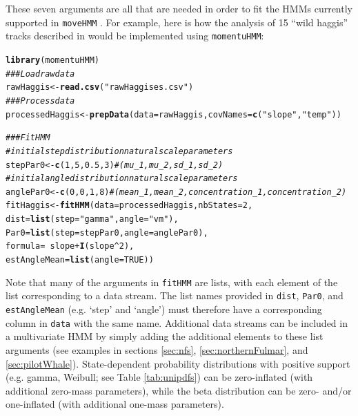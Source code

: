 \documentclass[12pt]{article}\usepackage[]{graphicx}\usepackage[]{xcolor}
\makeatletter
\newcommand{\hlnum}[1]{\textcolor[rgb]{0.686,0.059,0.569}{#1}}%
\newcommand{\hlsng}[1]{\textcolor[rgb]{0.192,0.494,0.8}{#1}}%
\newcommand{\hlcom}[1]{\textcolor[rgb]{0.678,0.584,0.686}{\textit{#1}}}%
\newcommand{\hlopt}[1]{\textcolor[rgb]{0,0,0}{#1}}%
\newcommand{\hldef}[1]{\textcolor[rgb]{0.345,0.345,0.345}{#1}}%
\newcommand{\hlkwb}[1]{\textcolor[rgb]{0.69,0.353,0.396}{#1}}%
\newcommand{\hlkwc}[1]{\textcolor[rgb]{0.333,0.667,0.333}{#1}}%
\newcommand{\hlkwd}[1]{\textcolor[rgb]{0.737,0.353,0.396}{\textbf{#1}}}%
\newenvironment{kframe}{%
 \def\at@end@of@kframe{}%
 \ifinner\ifhmode%
  \def\at@end@of@kframe{\end{minipage}}%
  \begin{minipage}{\columnwidth}%
 \fi\fi%
 \def\FrameCommand##1{\hskip\@totalleftmargin \hskip-\fboxsep
 \colorbox{shadecolor}{##1}\hskip-\fboxsep
     \hskip-\linewidth \hskip-\@totalleftmargin \hskip\columnwidth}%
 \MakeFramed {\advance\hsize-\width
   \@totalleftmargin\z@ \linewidth\hsize
   \@setminipage}}%
 {\par\unskip\endMakeFramed%
 \at@end@of@kframe}
\newenvironment{knitrout}{}{} %
\makeatother
\begin{document}
These seven arguments are all that are needed in order to fit the HMMs currently supported in \verb|moveHMM| \citep{MichelotEtAl2016}. For example, here is how the analysis of 15 ``wild haggis'' tracks described in \cite{MichelotEtAl2016} would be implemented using \verb|momentuHMM|:
\begin{knitrout}
\color{fgcolor}\begin{kframe}
\begin{alltt}
\hlkwd{library}\hldef{(momentuHMM)}
\hlcom{### Load raw data}
\hldef{rawHaggis}\hlkwb{<-}\hlkwd{read.csv}\hldef{(}\hlsng{"rawHaggises.csv"}\hldef{)}
\hlcom{### Process data}
\hldef{processedHaggis}\hlkwb{<-}\hlkwd{prepData}\hldef{(}\hlkwc{data}\hldef{=rawHaggis,}\hlkwc{covNames}\hldef{=}\hlkwd{c}\hldef{(}\hlsng{"slope"}\hldef{,}\hlsng{"temp"}\hldef{))}

\hlcom{### Fit HMM	}
\hlcom{# initial step distribution natural scale parameters}
\hldef{stepPar0} \hlkwb{<-} \hlkwd{c}\hldef{(}\hlnum{1}\hldef{,}\hlnum{5}\hldef{,}\hlnum{0.5}\hldef{,}\hlnum{3}\hldef{)} \hlcom{# (mu_1,mu_2,sd_1,sd_2)}
\hlcom{# initial angle distribution natural scale parameters }
\hldef{anglePar0} \hlkwb{<-} \hlkwd{c}\hldef{(}\hlnum{0}\hldef{,}\hlnum{0}\hldef{,}\hlnum{1}\hldef{,}\hlnum{8}\hldef{)} \hlcom{# (mean_1,mean_2,concentration_1,concentration_2)       	}
\hldef{fitHaggis} \hlkwb{<-} \hlkwd{fitHMM}\hldef{(}\hlkwc{data} \hldef{= processedHaggis,} \hlkwc{nbStates} \hldef{=} \hlnum{2}\hldef{,}
                    \hlkwc{dist} \hldef{=} \hlkwd{list}\hldef{(}\hlkwc{step} \hldef{=} \hlsng{"gamma"}\hldef{,} \hlkwc{angle} \hldef{=} \hlsng{"vm"}\hldef{),}
                    \hlkwc{Par0} \hldef{=} \hlkwd{list}\hldef{(}\hlkwc{step} \hldef{= stepPar0,} \hlkwc{angle} \hldef{= anglePar0),}
                    \hlkwc{formula} \hldef{=} \hlopt{~} \hldef{slope} \hlopt{+} \hlkwd{I}\hldef{(slope}\hlopt{^}\hlnum{2}\hldef{),}
                    \hlkwc{estAngleMean} \hldef{=} \hlkwd{list}\hldef{(}\hlkwc{angle}\hldef{=}\hlnum{TRUE}\hldef{))}
\end{alltt}
\end{kframe}
\end{knitrout}
Note that many of the arguments in \verb|fitHMM| are lists, with each element of the list corresponding to a data stream.  The list names provided in \verb|dist|, \verb|Par0|, and \verb|estAngleMean| (e.g. `step' and `angle') must therefore have a corresponding column in \verb|data| with the same name.  Additional data streams can be included in a multivariate HMM by simply adding the additional elements to these list arguments (see examples in sections \ref{sec:nfs}, \ref{sec:northernFulmar}, and \ref{sec:pilotWhale}).  State-dependent probability distributions with positive support (e.g. gamma, Weibull; see Table \ref{tab:unipdfs}) can be zero-inflated (with additional zero-mass parameters), while the beta distribution can be zero- and/or one-inflated (with additional one-mass parameters).
\end{document}
